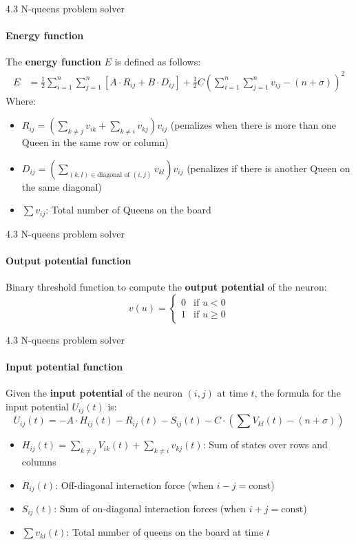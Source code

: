 \documentclass[11pt, aspectratio=169]{beamer}
\begin{document}
\begin{frame}{4.3 N-queens problem solver}
\framesubtitle{Energy function}
The \textbf{energy function} $E$ is defined as follows:
\begin{align*} 
E &= \frac{1}{2} \sum_{i=1}^n \sum_{j=1}^n \left[ A \cdot R_{ij} + B \cdot D_{ij}\right] + \frac{1}{2}C\left(\sum_{i=1}^n \sum_{j=1}^n v_{ij} - (n + \sigma)\right)^2
\end{align*}
Where:
\begin{itemize}
    \item $R_{ij}=\left(\sum_{k\ne j}v_{ik} + \sum_{k\ne i}v_{kj}\right)v_{ij}$
    (penalizes when there is more than one Queen in the same row or column)
    \item $D_{ij} = \left(\sum_{(k, l) \in \text{diagonal of }(i, j)}v_{kl}\right)v_{ij}$
    (penalizes if there is another Queen on the same diagonal)
    \item $\sum v_{ij}$: Total number of Queens on the board
\end{itemize}
\end{frame}

\begin{frame}{4.3 N-queens problem solver}
\framesubtitle{Output potential function}
Binary threshold function to compute the \textbf{output potential} of the neuron:
\[
v(u) = \begin{cases} 0 & \text{if } u < 0 \\ 1 & \text{if } u \ge 0 \end{cases}
\]
\end{frame}

\begin{frame}{4.3 N-queens problem solver}
\framesubtitle{Input potential function}
Given the \textbf{input potential} of the neuron $(i, j)$ at time $t$, the formula for the input potential $U_{ij}(t)$ is:
\begin{equation}
U_{ij}(t) = -A \cdot H_{ij}(t) - R_{ij}(t) - S_{ij}(t) - C \cdot \left( \sum V_{kl}(t) - (n + \sigma) \right)
\end{equation}

\begin{itemize}
    \item \( H_{ij}(t) = \sum_{k \neq j} V_{ik}(t) + \sum_{k \neq i} v_{kj}(t) \): Sum of states over rows and columns
    \item \( R_{ij}(t) \): Off-diagonal interaction force (when \( i - j = \text{const} \))
    \item \( S_{ij}(t) \): Sum of on-diagonal interaction forces (when \( i + j = \text{const} \))
    \item \( \sum v_{kl}(t) \): Total number of queens on the board at time \( t \)
\end{itemize}
\end{frame}
\end{document}
